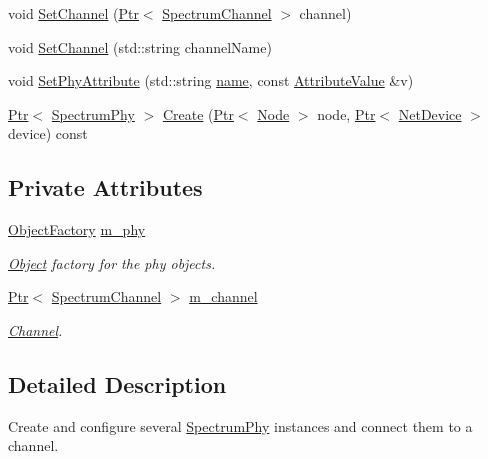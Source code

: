 \begin{DoxyCompactItemize}
void \hyperlink{classns3_1_1SpectrumPhyHelper_a04b00fb745aa546a167bc8691cd646af}{Set\+Channel} (\hyperlink{classns3_1_1Ptr}{Ptr}$<$ \hyperlink{classns3_1_1SpectrumChannel}{Spectrum\+Channel} $>$ channel)
\item 
void \hyperlink{classns3_1_1SpectrumPhyHelper_a228fe29980ded0e7c08386fd0398c442}{Set\+Channel} (std\+::string channel\+Name)
\item 
void \hyperlink{classns3_1_1SpectrumPhyHelper_a9db1b9fd82eafb2213d40c4f108b7ff7}{Set\+Phy\+Attribute} (std\+::string \hyperlink{generate__test__data__lte__spectrum__model_8m_ab74e6bf80237ddc4109968cedc58c151}{name}, const \hyperlink{classns3_1_1AttributeValue}{Attribute\+Value} \&v)
\item 
\hyperlink{classns3_1_1Ptr}{Ptr}$<$ \hyperlink{classns3_1_1SpectrumPhy}{Spectrum\+Phy} $>$ \hyperlink{classns3_1_1SpectrumPhyHelper_ab202f7d0150cae86b58868d20122738a}{Create} (\hyperlink{classns3_1_1Ptr}{Ptr}$<$ \hyperlink{classns3_1_1Node}{Node} $>$ node, \hyperlink{classns3_1_1Ptr}{Ptr}$<$ \hyperlink{classns3_1_1NetDevice}{Net\+Device} $>$ device) const 
\end{DoxyCompactItemize}
\subsection*{Private Attributes}
\begin{DoxyCompactItemize}
\item 
\hyperlink{classns3_1_1ObjectFactory}{Object\+Factory} \hyperlink{classns3_1_1SpectrumPhyHelper_a504a56c799e0a0cbfd751eac618f2a89}{m\+\_\+phy}
\begin{DoxyCompactList}\small\item\em \hyperlink{classns3_1_1Object}{Object} factory for the phy objects. \end{DoxyCompactList}\item 
\hyperlink{classns3_1_1Ptr}{Ptr}$<$ \hyperlink{classns3_1_1SpectrumChannel}{Spectrum\+Channel} $>$ \hyperlink{classns3_1_1SpectrumPhyHelper_a30f5f46f27867be2fdddf3dbfe1fd239}{m\+\_\+channel}
\begin{DoxyCompactList}\small\item\em \hyperlink{classns3_1_1Channel}{Channel}. \end{DoxyCompactList}\end{DoxyCompactItemize}


\subsection{Detailed Description}
Create and configure several \hyperlink{classns3_1_1SpectrumPhy}{Spectrum\+Phy} instances and connect them to a channel. 

